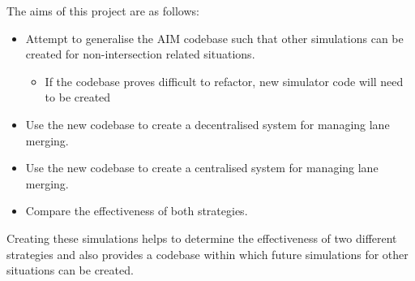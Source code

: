 The aims of this project are as follows:
\begin{itemize}
\item Attempt to generalise the AIM codebase such that other simulations can be created for non-intersection related situations.
\begin{itemize}
\item If the codebase proves difficult to refactor, new simulator code will need to be created
\end{itemize}
\item Use the new codebase to create a decentralised system for managing lane merging.
\item Use the new codebase to create a centralised system for managing lane merging.
\item Compare the effectiveness of both strategies.
\end{itemize}

Creating these simulations helps to determine the effectiveness of two different strategies and also provides a codebase within which future simulations for other situations can be created.